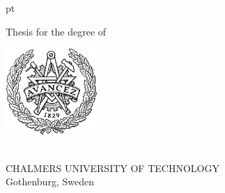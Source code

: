 {
 pt
\centering
\thispagestyle{empty}         %


\begin{normalsize}{\uppercase Thesis for the degree of 
}
\end{normalsize}

\vspace{3 cm}

{\large \textbf{\thesistitle} \par}
\vskip 1pc
{\large \thesissubtitle}
\vspace{1.5 cm}
\vspace{-10pt}

{\normalsize \MakeUppercase{\thesisauthor} \par}

\vspace{5 cm}

\includegraphics[width=35mm]{frontmatter/standard-images/chalmers_logo}
\vfill
\vspace{0.5 cm}

\thesisdepartment \\
{\scshape CHALMERS UNIVERSITY OF TECHNOLOGY} \\
Gothenburg, Sweden \thesisyear

\newpage
}
